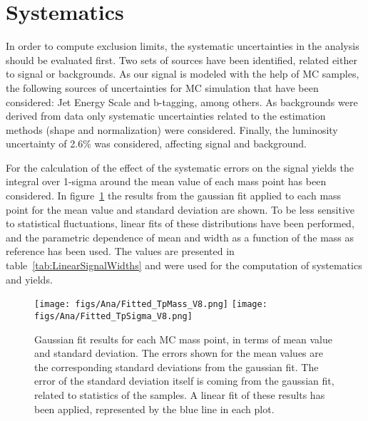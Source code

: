 \section{Systematics}
\label{sec:sys}

In order to compute exclusion limits, the systematic uncertainties in the analysis should be evaluated first. Two sets of sources have been identified, related either to signal or backgrounds. As our signal is modeled with the help of MC samples, the following sources of uncertainties for MC simulation that have been considered: Jet Energy Scale and b-tagging, among others. As backgrounds were derived from data only systematic uncertainties related to the estimation methods (shape and normalization) were considered. Finally, the luminosity uncertainty of 2.6\% was considered, affecting signal and background. 

For the calculation of the effect of the systematic errors on the signal yields the integral over 1-sigma around the mean value of each mass point has been considered. In figure~\ref{fig:LinearFitMeanSigma} the results from the gaussian fit applied to each mass point for the mean value and standard deviation are shown. To be less sensitive to statistical fluctuations, linear fits of these distributions have been performed, and the parametric dependence of mean and width as a function of the mass as reference has been used. The values are presented in table~\ref{tab:LinearSignalWidths} and were used for the computation of systematics and yields.

\begin{figure}[!Hhtbp]
  \begin{center}
    \texttt{[image: figs/Ana/Fitted\_TpMass\_V8.png]}
    \texttt{[image: figs/Ana/Fitted\_TpSigma\_V8.png]}
    \caption{Gaussian fit results for each MC mass point, in terms of mean value and standard deviation. The errors shown for the mean values are the corresponding standard deviations from the gaussian fit. The error of the standard deviation itself is coming from the gaussian fit, related to statistics of the samples. A linear fit of these results has been applied, represented by the blue line in each plot.}
    \label{fig:LinearFitMeanSigma}
  \end{center}
\end{figure}

